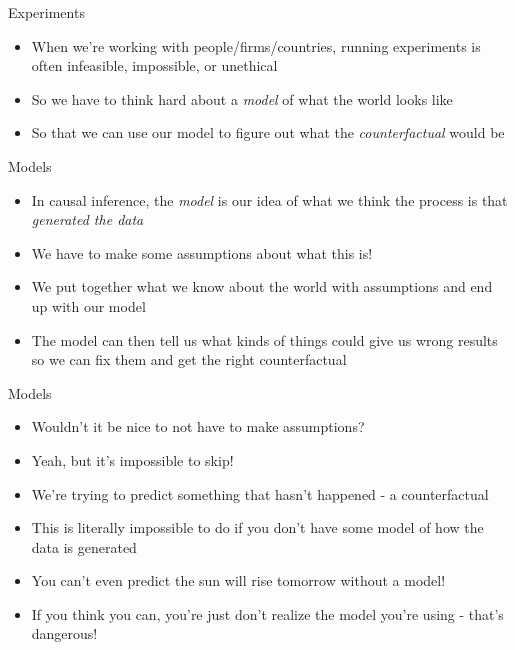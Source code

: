 \documentclass[
  ignorenonframetext,
]{beamer}
\providecommand{\tightlist}{%
  \setlength{\itemsep}{0pt}\setlength{\parskip}{0pt}}
\begin{document}
\begin{frame}{Experiments}
\label{experiments-1}
\begin{itemize}
\tightlist
\item
  When we're working with people/firms/countries, running experiments is
  often infeasible, impossible, or unethical
\item
  So we have to think hard about a \emph{model} of what the world looks
  like
\item
  So that we can use our model to figure out what the
  \emph{counterfactual} would be
\end{itemize}
\end{frame}

\begin{frame}{Models}
\label{models}
\begin{itemize}
\tightlist
\item
  In causal inference, the \emph{model} is our idea of what we think the
  process is that \emph{generated the data}
\item
  We have to make some assumptions about what this is!
\item
  We put together what we know about the world with assumptions and end
  up with our model
\item
  The model can then tell us what kinds of things could give us wrong
  results so we can fix them and get the right counterfactual
\end{itemize}
\end{frame}

\begin{frame}{Models}
\label{models-1}
\begin{itemize}
\tightlist
\item
  Wouldn't it be nice to not have to make assumptions?
\item
  Yeah, but it's impossible to skip!
\item
  We're trying to predict something that hasn't happened - a
  counterfactual
\item
  This is literally impossible to do if you don't have some model of how
  the data is generated
\item
  You can't even predict the sun will rise tomorrow without a model!
\item
  If you think you can, you're just don't realize the model you're using
  - that's dangerous!
\end{itemize}
\end{frame}
\end{document}
